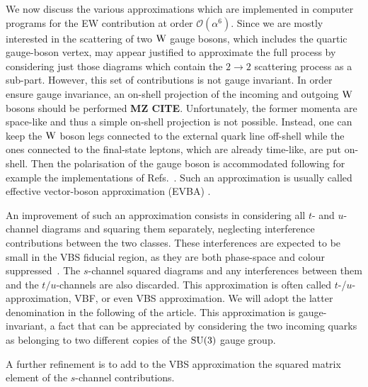 We now discuss the various approximations which are implemented in computer programs for the EW contribution at order $\mathcal{O}{\left(\alpha^{6}\right)}$.
Since we are mostly interested in 
the scattering of two $\text{W}$ gauge bosons, which includes the quartic gauge-boson vertex, may appear justified to approximate the 
full process by considering just those diagrams which contain the $2\rightarrow 2$ scattering process as a sub-part.
However, this set of contributions is not gauge invariant.
In order ensure gauge invariance, an on-shell projection of the incoming and outgoing $\text{W}$ bosons should be performed {\bf MZ CITE}.
Unfortunately, the former momenta are space-like and thus a simple on-shell projection is not possible.
Instead, one can keep the $\text{W}$ boson legs connected to the external quark line off-shell while the ones connected 
to the final-state leptons, which are already time-like, are put on-shell. 
Then the polarisation of the gauge boson is accommodated following for example the implementations of Refs.~\cite{Kuss:1995yv,Accomando:2006hq}.
Such an approximation is usually called effective vector-boson approximation (EVBA) \cite{Dawson:1984gx,Duncan:1985vj,Cahn:1983ip}.

An improvement of such an approximation consists 
in considering all $t$- and $u$-channel diagrams and squaring them separately, neglecting interference contributions between the two classes.
These interferences are expected to be small in the VBS fiducial region, as they are both phase-space and colour suppressed~\cite{Oleari:2003tc,Denner:2012dz}.
The $s$-channel squared diagrams and any interferences between them and the  $t/u$-channels are also discarded.
This approximation is often called $t$-/$u$- approximation, VBF, or even VBS approximation.
We will adopt the latter denomination in the following of the article.
This approximation is gauge-invariant, a fact that can be appreciated by considering the two incoming quarks as belonging to two different copies of the $\rm{SU}(3)$ gauge group.

A further refinement is to add to the VBS approximation the squared matrix element of the $s$-channel contributions.

